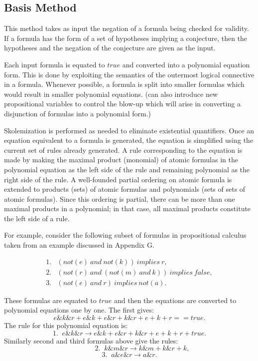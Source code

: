 \subsection{\Groebner Basis Method}

This method takes as input the negation of a formula being
checked for validity. If a formula has the form of a set of
hypotheses implying a conjecture, then the hypotheses and the
negation of the conjecture are given as the input.

Each input formula is equated to $true$ and converted into a
polynomial equation form. This is done by exploiting the
semantics of the outermost logical connective in a formula.
Whenever possible, a formula is split into smaller formulas which
would result in smaller polynomial equations.  (\RRL can also
introduce new propositional variables to control the blow-up
which will arise in converting a disjunction of formulas into a
polynomial form.)

Skolemization is performed as needed to eliminate existential
quantifiers. Once an equation equivalent to a formula is
generated, the equation is simplified using the current set of
rules already generated. A rule corresponding to the equation is
made by making the maximal product (monomial) of atomic formulas
in the polynomial equation as the left side of the rule and
remaining polynomial as the right side of the rule.  A
well-founded partial ordering on atomic formula is extended to
products (sets) of atomic formulas and polynomials (sets of sets
of atomic formulas). Since this ordering is partial, there can be
more than one maximal products in a polynomial; in that case, all
maximal products constitute the left side of a rule.

For example, consider the following subset of formulas in
propositional calculus taken from an example discussed in
Appendix G.

\[\begin{array}{rl}
  1. & (not(e)~and~not(k))~implies~r,  \\
  2. & (not(r)~and~(not(m)~and~k))~implies~false, \\
  3. & (not(e)~and~r)~implies~not(a). 
\end{array}\]

These formulas are equated to $true$ and then the equations are
converted to polynomial equations one by one. The first gives:
  \[  e \& k \& r + e \& k + e \& r + k \& r + e + k + r == true.\]
The rule for this polynomial equation is:
  \[ 1. \; \; e \& k \& r \rightarrow e \& k + e \& r + k \& r + e + k + r + true.\]
Similarly second and third formulas above give the rules:
  \[~~~~~~~~\; \; \; \; \; \; \; 2. \; \; k \& m \& r \rightarrow k \& m + k \& r + k,\]
  \[ 3. \; \; a \& e \& r \rightarrow a \& r. \]

